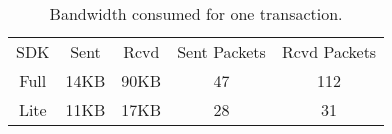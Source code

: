 \begin{table}[H]
    \centering
    \begin{tabular}{c|c|c|c|c}
        SDK & Sent & Rcvd & Sent Packets & Rcvd Packets  \\
        Full & 14KB & 90KB & 47 & 112 \\
        Lite & 11KB & 17KB & 28 & 31 \\

    \end{tabular}
    \caption{Bandwidth consumed for one transaction.}
    \label{tab:Bandwidth}
\end{table}